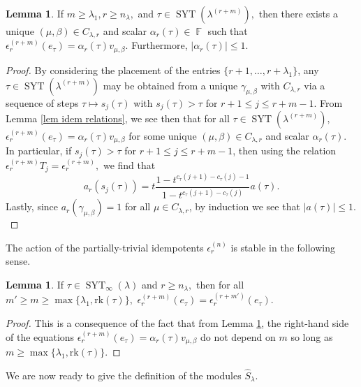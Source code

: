 \documentclass[12pt,reqno]{amsart}
\theoremstyle{definition}
\newtheorem{lem}[thm]{Lemma}
\DeclareMathOperator{\bF}{\mathbb{F}}
\DeclareMathOperator{\SYT}{\mathrm{SYT}}
\begin{document}
\begin{lem}\label{lem action of partial triv idem}
    If $m \geq \lambda_1, r\geq n_{\lambda},$ and $\tau \in \SYT(\lambda^{(r+m)}),$ then there exists a unique $(\mu,\beta) \in C_{\lambda,r}$ and scalar $\alpha_r(\tau) \in \bF$ such that $\epsilon_{r}^{(r+m)}(e_{\tau}) = \alpha_r(\tau) v_{\mu,\beta}$. Furthermore, $|\alpha_r(\tau)| \leq 1.$
\end{lem}
\begin{proof}
    By considering the placement of the entries $\{r+1,\dots,r+\lambda_1\}$, any $\tau \in \SYT(\lambda^{(r+m)})$ may be obtained from a unique $\gamma_{\mu,\beta}$ with $C_{\lambda,r}$ via a sequence of steps $\tau \mapsto s_j(\tau)$ with $s_{j}(\tau) > \tau$ for $r+1 \leq j \leq r+m-1.$ From Lemma \ref{lem idem relations}, we see then that for all $\tau \in \SYT(\lambda^{(r+m)}),$ $\epsilon_{r}^{(r+m)}(e_{\tau}) = \alpha_r(\tau) v_{\mu,\beta}$ for some unique $(\mu,\beta) \in C_{\lambda,r}$ and scalar $\alpha_r(\tau).$ In particular, if $s_{j}(\tau) > \tau$ for $r+1 \leq j \leq r+m-1$, then using the relation $\epsilon_r^{(r+m)}T_j = \epsilon_r^{(r+m)},$ we find that 
    $$a_r(s_{j}(\tau)) = t\frac{1-t^{c_{\tau}(j+1)-c_{\tau}(j)-1}}{1-t^{c_{\tau}(j+1)-c_{\tau}(j)}} a(\tau).$$ Lastly, since $a_r(\gamma_{\mu,\beta}) = 1$ for all $\mu \in C_{\lambda,r}$, by induction we see that $|a(\tau)| \leq 1.$
\end{proof}

The action of the partially-trivial idempotents $\epsilon_{r}^{(n)}$ is stable in the following sense.

\begin{lem}\label{lem stability of partial triv idem}
    If $\tau \in \SYT_{\infty}(\lambda)$ and $r \geq n_{\lambda},$ then for all $m' \geq m \geq \max\{\lambda_1, \mathrm{rk}(\tau)\},$ $\epsilon_{r}^{(r+m)}(e_{\tau}) = \epsilon_{r}^{(r+m')}(e_{\tau}).$
\end{lem}
\begin{proof}
    This is a consequence of the fact that from Lemma \ref{lem action of partial triv idem}, the right-hand side of the equations $\epsilon_{r}^{(r+m)}(e_{\tau}) = \alpha_r(\tau) v_{\mu,\beta}$ do not depend on $m$ so long as $m \geq \max\{\lambda_1, \mathrm{rk}(\tau)\}.$
\end{proof}

We are now ready to give the definition of the modules $\hat{S}_{\lambda}.$
\end{document}
